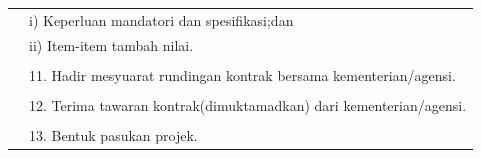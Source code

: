 \documentclass[
]{article}
\begin{document}
\begin{longtable}[]{@{}ll@{}}
\begin{minipage}[t]{0.27\columnwidth}\raggedright
\strut
\end{minipage} & \begin{minipage}[t]{0.67\columnwidth}\raggedright
i) Keperluan mandatori dan spesifikasi;dan\strut
\end{minipage}\tabularnewline
\begin{minipage}[t]{0.27\columnwidth}\raggedright
\strut
\end{minipage} & \begin{minipage}[t]{0.67\columnwidth}\raggedright
ii) Item-item tambah nilai.\strut
\end{minipage}\tabularnewline
\begin{minipage}[t]{0.27\columnwidth}\raggedright
\strut
\end{minipage} & \begin{minipage}[t]{0.67\columnwidth}\raggedright
\strut
\end{minipage}\tabularnewline
\begin{minipage}[t]{0.27\columnwidth}\raggedright
\strut
\end{minipage} & \begin{minipage}[t]{0.67\columnwidth}\raggedright
11. Hadir mesyuarat rundingan kontrak bersama kementerian/agensi.\strut
\end{minipage}\tabularnewline
\begin{minipage}[t]{0.27\columnwidth}\raggedright
\strut
\end{minipage} & \begin{minipage}[t]{0.67\columnwidth}\raggedright
\strut
\end{minipage}\tabularnewline
\begin{minipage}[t]{0.27\columnwidth}\raggedright
\strut
\end{minipage} & \begin{minipage}[t]{0.67\columnwidth}\raggedright
12. Terima tawaran kontrak(dimuktamadkan) dari kementerian/agensi.\strut
\end{minipage}\tabularnewline
\begin{minipage}[t]{0.27\columnwidth}\raggedright
\strut
\end{minipage} & \begin{minipage}[t]{0.67\columnwidth}\raggedright
\strut
\end{minipage}\tabularnewline
\begin{minipage}[t]{0.27\columnwidth}\raggedright
\strut
\end{minipage} & \begin{minipage}[t]{0.67\columnwidth}\raggedright
13. Bentuk pasukan projek.\strut
\end{minipage}\tabularnewline
\bottomrule
\end{longtable}
\end{document}
